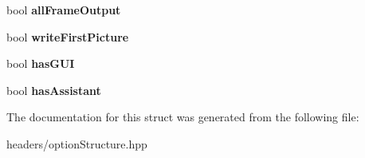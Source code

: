 \begin{DoxyCompactItemize}
\item 
\hypertarget{structOptions_a799fecf713718ceb2399195742cc6b5b}{bool {\bfseries all\-Frame\-Output}}\label{structOptions_a799fecf713718ceb2399195742cc6b5b}

\item 
\hypertarget{structOptions_a51e700e7824100576ebb4655145afc08}{bool {\bfseries write\-First\-Picture}}\label{structOptions_a51e700e7824100576ebb4655145afc08}

\item 
\hypertarget{structOptions_a808d607657e61484aa1eb3f57ad0f6c7}{bool {\bfseries has\-G\-U\-I}}\label{structOptions_a808d607657e61484aa1eb3f57ad0f6c7}

\item 
\hypertarget{structOptions_aada243e50c7ec08cf7cf578685bbe074}{bool {\bfseries has\-Assistant}}\label{structOptions_aada243e50c7ec08cf7cf578685bbe074}

\end{DoxyCompactItemize}


The documentation for this struct was generated from the following file\-:\begin{DoxyCompactItemize}
\item 
headers/option\-Structure.\-hpp\end{DoxyCompactItemize}
